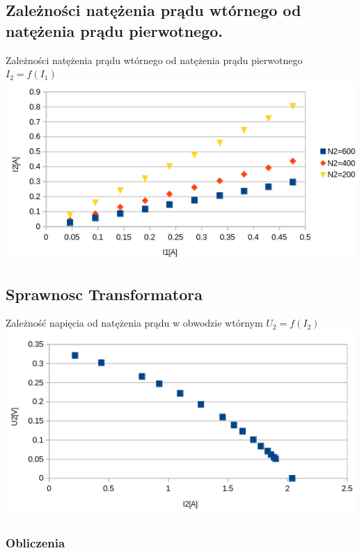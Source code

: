 \documentclass[a4paper, 11pt]{article}
\begin{document}

\subsection{Zależności natężenia prądu wtórnego od natężenia prądu pierwotnego.}\label{sub: zaleznosc} %
\begin{center}
	\large Zależności natężenia prądu wtórnego od natężenia prądu
	pierwotnego
	$I_2 = f(I_1)$
	\includegraphics[scale=0.8]{images/2.png}
\end{center}


\pagebreak
\subsection{Sprawnosc Transformatora}\label{sub:sprawnosc_transformatora} %
\begin{center}
	\large Zależność napięcia od natężenia prądu w obwodzie wtórnym
	$U_2 = f(I_2)$
	\includegraphics[scale=0.8]{images/3.png}
\end{center}
\subsubsection{Obliczenia}
\end{document}
